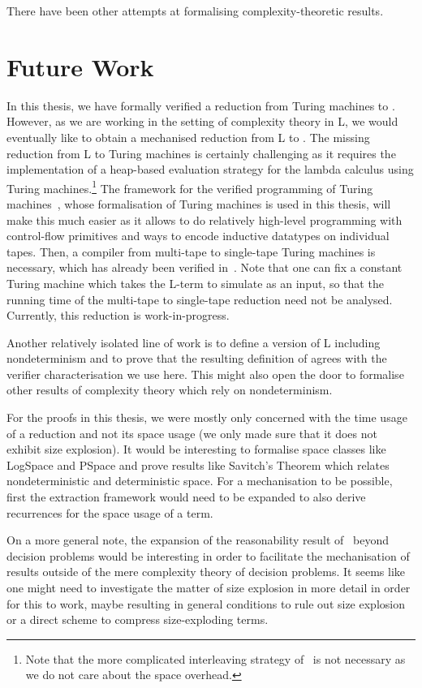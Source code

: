 There have been other attempts at formalising complexity-theoretic results.

\section{Future Work}
In this thesis, we have formally verified a reduction from Turing machines to \SAT{}. However, as we are working in the setting of complexity theory in L, we would eventually like to obtain a mechanised reduction from L to \SAT{}. 
The missing reduction from L to Turing machines is certainly challenging as it requires the implementation of a heap-based evaluation strategy for the lambda calculus using Turing machines.\footnote{Note that the more complicated interleaving strategy of~\cite{ForsterKunzeRoth:2019:wcbv-Reasonable} is not necessary as we do not care about the space overhead.} The framework for the verified programming of Turing machines~\cite{ForsterEtAl:2019:VerifiedTMs}, whose formalisation of Turing machines is used in this thesis, will make this much easier as it allows to do relatively high-level programming with control-flow primitives and ways to encode inductive datatypes on individual tapes. 
Then, a compiler from multi-tape to single-tape Turing machines is necessary, which has already been verified in~\cite{ForsterEtAl:2019:VerifiedTMs}. Note that one can fix a constant Turing machine which takes the L-term to simulate as an input, so that the running time of the multi-tape to single-tape reduction need not be analysed. 
Currently, this reduction is work-in-progress.

Another relatively isolated line of work is to define a version of L including nondeterminism and to prove that the resulting definition of \NP{} agrees with the verifier characterisation we use here. This might also open the door to formalise other results of complexity theory which rely on nondeterminism. 

For the proofs in this thesis, we were mostly only concerned with the time usage of a reduction and not its space usage (we only made sure that it does not exhibit size explosion). It would be interesting to formalise space classes like \textsf{LogSpace} and \textsf{PSpace} and prove results like Savitch's Theorem which relates nondeterministic and deterministic space. For a mechanisation to be possible, first the extraction framework would need to be expanded to also derive recurrences for the space usage of a term.

On a more general note, the expansion of the reasonability result of~\cite{ForsterKunzeRoth:2019:wcbv-Reasonable} beyond decision problems would be interesting in order to facilitate the mechanisation of results outside of the mere complexity theory of decision problems. It seems like one might need to investigate the matter of size explosion in more detail in order for this to work, maybe resulting in general conditions to rule out size explosion or a direct scheme to compress size-exploding terms. 

